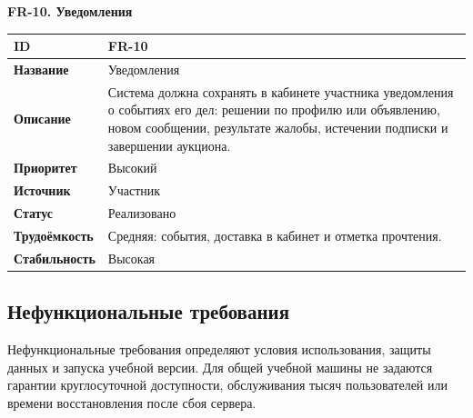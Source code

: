 \noindent\begin{minipage}{\linewidth}
\fontsize{12}{14}\selectfont
\textbf{FR-10. Уведомления}\par\smallskip
\setlength{\tablecontentwidth}{\dimexpr\linewidth-4\tabcolsep-3\arrayrulewidth\relax}
\begin{tabular}{|>{\RaggedRight\arraybackslash}p{0.25\tablecontentwidth}|>{\RaggedRight\arraybackslash}p{0.75\tablecontentwidth}|}
\hline
\textbf{ID} & FR-10 \\ \hline
\textbf{Название} & Уведомления \\ \hline
\textbf{Описание} & Система должна сохранять в кабинете участника уведомления о событиях его дел: решении по профилю или объявлению, новом сообщении, результате жалобы, истечении подписки и завершении аукциона. \\ \hline
\textbf{Приоритет} & Высокий \\ \hline
\textbf{Источник} & Участник \\ \hline
\textbf{Статус} & Реализовано \\ \hline
\textbf{Трудоёмкость} & Средняя: события, доставка в кабинет и отметка прочтения. \\ \hline
\textbf{Стабильность} & Высокая \\ \hline
\end{tabular}
\end{minipage}\par\medskip

\FloatBarrier
{}
\subsection{Нефункциональные требования}

Нефункциональные требования определяют условия использования, защиты данных и запуска учебной версии. Для общей учебной машины не задаются гарантии круглосуточной доступности, обслуживания тысяч пользователей или времени восстановления после сбоя сервера.

